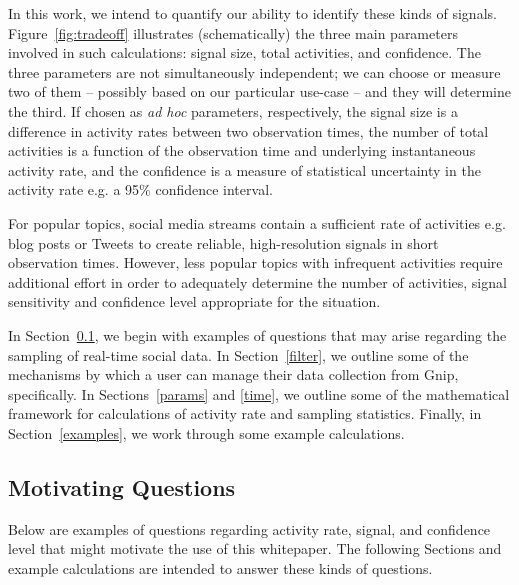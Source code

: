 \documentclass{article}
\begin{document}
In this work, 
we intend to quantify our ability to identify these kinds of signals. Figure~\ref{fig:tradeoff} 
illustrates (schematically) the three main parameters involved in such calculations: signal size, total 
activities, and confidence. The three parameters are not simultaneously independent; we can 
choose or measure two of them -- possibly based on our particular use-case -- and they will 
determine the third. If chosen as \emph{ad hoc} parameters, respectively, the signal 
size is a difference in activity rates between two observation times, the number of total 
activities is a function of the observation time and underlying instantaneous activity rate, and the 
confidence is a measure of statistical uncertainty in the activity rate e.g. a 95$\%$ 
confidence interval.

For popular topics, social media streams contain a sufficient rate of activities e.g. blog posts or 
Tweets to create reliable, high-resolution signals in short observation times.  
However, less popular topics with infrequent activities require additional effort in order to adequately 
determine the number of activities, signal sensitivity and confidence level appropriate for the 
situation.

In Section~\ref{Qs}, we begin with examples of questions that may arise regarding 
the sampling of real-time social data. In Section~\ref{filter}, we outline some of the mechanisms 
by which a user can manage their data collection from Gnip, specifically. In Sections~\ref{params} and 
\ref{time}, we outline some of the mathematical framework for calculations 
of activity rate and sampling statistics. Finally, in Section~\ref{examples}, we work 
through some example calculations.



\subsection{Motivating Questions} 
\label{Qs}

Below are examples of questions regarding activity rate, signal, and confidence level that might 
motivate the use of this whitepaper. The following Sections and example calculations are intended 
to answer these kinds of questions.
\end{document}
